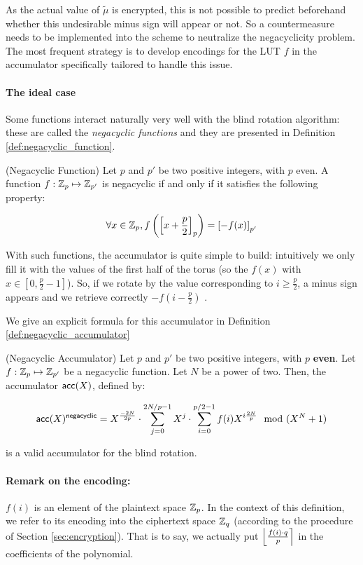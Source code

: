 As the actual value of $\tilde{\mu}$ is encrypted, this is not possible to predict beforehand whether this undesirable minus sign will appear or not. So a countermeasure needs to be implemented into the scheme to neutralize the negacyclicity problem. The most frequent strategy is to develop encodings for the LUT $f$ in the accumulator specifically tailored to handle this issue.


\paragraph{The ideal case}

Some functions interact naturally very well with the blind rotation algorithm: these are called the \textit{negacyclic functions} and they are presented in Definition \ref{def:negacyclic_function}.


\begin{definition} (Negacyclic Function)
	Let $p$ and $p'$ be two positive integers, with $p$ even. A function $f : \mathbb{Z}_p \mapsto \mathbb{Z}_{p'}$ is negacyclic if and only if it satisfies the following property:
	
	\[
		\forall x \in \mathbb{Z}_p, f\left (\left [ x + \frac p 2 \right ]_{p} \right ) = \left [ -f(x) \right ]_{p'}
	\]
	
	\label{def:negacyclic_function}
\end{definition}


With such functions, the accumulator is quite simple to build: intuitively we only fill it with the values of the first half of the torus (so the $f(x)$ with $x \in \left [0, \frac p 2 - 1 \right ]$). So, if we rotate by the value corresponding to $i \ge \frac p 2$, a minus sign appears and we retrieve correctly $-f\left(i - \frac p 2 \right)$ .

We give an explicit formula for this accumulator in Definition \ref{def:negacyclic_accumulator}

\begin{definition} (Negacyclic Accumulator)
		\label{def:negacyclic_accumulator}
		Let $p$ and $p'$ be two positive integers, with $p$ \textbf{even}. Let $f:\mathbb{Z}_p \mapsto \mathbb{Z}_{p'}$ be a negacyclic function. Let $N$ be a power of two. Then, the accumulator $\textsf{acc}(X)$, defined by:
	
	\[
		\textsf{acc}(X)^{\textsf{negacyclic}} = X^{\frac{-2N}{2p}} \cdot \sum_{j=0}^{2N / p - 1} X^j \cdot \sum_{i=0}^{p/2 - 1} f(i) X^{i \frac{2N}{p}} \mod (X^N + 1)
	\]
	
	is a valid accumulator for the blind rotation.
	
	\paragraph{Remark on the encoding:}
	$f(i)$ is an element of the plaintext space $\mathbb{Z}_p$. In the context of this definition, we refer to its encoding into the ciphertext space $\mathbb{Z}_q$ (according to the procedure of Section \ref{sec:encryption}). That is to say, we actually put $\left \lfloor \frac{f(i) \cdot q}{p} \right \rceil$ in the coefficients of the polynomial.
\end{definition}



